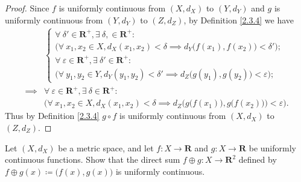 \begin{proof}
    Since \(f\) is uniformly continuous from \((X, d_X)\) to \((Y, d_Y)\) and \(g\) is uniformly continuous from \((Y, d_Y)\) to \((Z, d_Z)\), by Definition \ref{2.3.4} we have
    \begin{align*}
                 & \begin{cases}
            \forall\ \delta' \in \mathbf{R}^+, \exists\ \delta, \in \mathbf{R}^+ :                                    \\
            \Big(\forall\ x_1, x_2 \in X, d_X(x_1, x_2) < \delta \implies d_Y\big(f(x_1), f(x_2)\big) < \delta'\Big); \\
            \forall\ \varepsilon \in \mathbf{R}^+, \exists\ \delta' \in \mathbf{R}^+ :                                \\
            \Big(\forall\ y_1, y_2 \in Y, d_Y(y_1, y_2) < \delta' \implies d_Z\big(g(y_1), g(y_2)\big) < \varepsilon\Big);
        \end{cases}                                                                                                            \\
        \implies & \forall\ \varepsilon \in \mathbf{R}^+, \exists\ \delta \in \mathbf{R}^+ :                                                             \\
                 & \bigg(\forall\ x_1, x_2 \in X, d_X(x_1, x_2) < \delta \implies d_Z\Big(g\big(f(x_1)\big), g\big(f(x_2)\big)\Big) < \varepsilon\bigg).
    \end{align*}
    Thus by Definition \ref{2.3.4} \(g \circ f\) is uniformly continuous from \((X, d_X)\) to \((Z, d_Z)\).
\end{proof}

\begin{exercise}\label{ex 2.3.5}
    Let \((X, d_X)\) be a metric space, and let \(f : X \to \mathbf{R}\) and \(g : X \to \mathbf{R}\) be uniformly continuous functions.
    Show that the direct sum \(f \oplus g : X \to \mathbf{R}^2\) defined by \(f \oplus g(x) \coloneqq \big(f(x), g(x)\big)\) is uniformly continuous.
\end{exercise}

